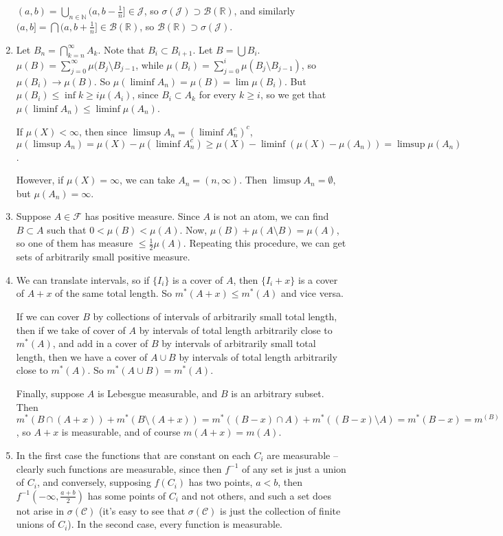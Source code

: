\documentclass{article}
\newcommand\RR{\mathbb R}
\newcommand\C{\mathscr C}
\newcommand\F{\mathscr F}
\newcommand\NN{\mathbb N}
\newcommand\J{\mathscr J}
\newcommand\B{\mathscr B}
\begin{document}
\begin{enumerate}
  $(a,b) = \bigcup_{n \in \NN} (a,b-\frac1n] \in \J$, so $\sigma(\J) \supset \B(\RR)$, and similarly $(a,b] = \bigcap (a,b+\frac1n] \in \B(\RR)$, so $\B(\RR) \supset \sigma(\J)$.
  
  \item Let $B_n = \bigcap_{k=n}^\infty A_k$. Note that $B_i \subset B_{i+1}$. Let $B = \bigcup B_i$. $\mu(B) = \sum_{j=0}^\infty \mu(B_j \setminus B_{j-1}$, while $\mu(B_i) = \sum_{j=0}^i \mu(B_j \setminus B_{j-1})$, so $\mu(B_i) \to \mu(B)$. So $\mu(\liminf A_n) = \mu(B) = \lim \mu(B_i)$. But $\mu(B_i) \leq \inf{k \geq i} \mu(A_i)$, since $B_i \subset A_k$ for every $k \geq i$, so we get that $\mu(\liminf A_n) \leq \liminf \mu(A_n)$.
  
  If $\mu(X) < \infty$, then since  $\limsup A_n = (\liminf A_n^c)^c$, $\mu(\limsup A_n) = \mu(X) - \mu(\liminf A_n^c) \geq \mu(X) - \liminf (\mu(X) - \mu(A_n)) = \limsup \mu(A_n)$.
  
  However, if $\mu(X) = \infty$, we can take $A_n = (n,\infty)$. Then $\limsup A_n = \emptyset$, but $\mu(A_n) = \infty$.
  
  \item Suppose $A \in \F$ has positive measure. Since $A$ is not an atom, we can find $B \subset A$ such that $0 < \mu(B) < \mu(A)$. Now, $\mu(B) + \mu(A \setminus B) = \mu(A)$, so one of them has measure $\leq \frac12\mu(A)$. Repeating this procedure, we can get sets of arbitrarily small positive measure.
  
  \item We can translate intervals, so if $\{I_i\}$ is a cover of $A$, then $\{I_i+x\}$ is a cover of $A+x$ of the same total length. So $m^*(A+x) \leq m^*(A)$ and vice versa.
  
  If we can cover $B$ by collections of intervals of arbitrarily small total length, then if we take of cover of $A$ by intervals of total length arbitrarily close to $m^*(A)$, and add in a cover of $B$ by intervals of arbitrarily small total length, then we have a cover of $A \cup B$ by intervals of total length arbitrarily close to $m^*(A)$. So $m^*(A \cup B) = m^*(A)$.
  
  Finally, suppose $A$ is Lebesgue measurable, and $B$ is an arbitrary subset. Then $m^*(B \cap (A+x)) + m^*(B \setminus (A+x)) = m^*((B-x) \cap A) + m^*((B-x) \setminus A) = m^*(B-x) = m^(B)$, so $A+x$ is measurable, and of course $m(A+x) = m(A)$.
  
  \item In the first case the functions that are constant on each $C_i$ are measurable -- clearly such functions are measurable, since then $f^{-1}$ of any set is just a union of $C_i$, and conversely, supposing $f(C_i)$ has two points, $a < b$, then $f^{-1}(-\infty,\frac{a+b}2)$ has some points of $C_i$ and not others, and such a set does not arise in $\sigma(\C)$ (it's easy to see that $\sigma(\C)$ is just the collection of finite unions of $C_i$). In the second case, every function is measurable.
  

\end{enumerate}
\end{document}
